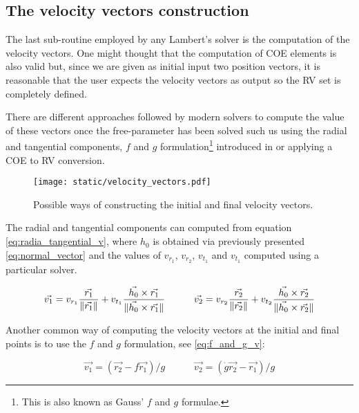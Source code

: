 \subsection{The velocity vectors construction}

The last sub-routine employed by any Lambert's solver is the computation of the
velocity vectors. One might thought that the computation of COE elements is also
valid but, since we are given as initial input two position vectors, it is
reasonable that the user expects the velocity vectors as output so the RV set is
completely defined.

There are different approaches followed by modern solvers to compute the value
of these vectors once the free-parameter has been solved such us using the
radial and tangential components, $f$ and $g$ formulation\footnote{This is also
known as Gauss' $f$ and $g$ formulae.} introduced in \cite{bate1971} or applying a
COE to RV conversion.

\vspace{0.5cm}
\begin{figure}[h]
  \centering
  \texttt{[image: static/velocity\_vectors.pdf]}
  \caption{Possible ways of constructing the initial and final velocity vectors.}
  \label{fig:velocity_vectors}
\end{figure}

The radial and tangential components can computed from equation
\ref{eq:radia_tangential_v}, where $h_0$ is obtained via previously presented
\ref{eq:normal_vector} and the values of $v_{r_1}$, $v_{r_2}$, $v_{t_1}$ and
$v_{t_1}$ computed using a particular solver.

\begin{equation}
	\vec{v_{1}} = v_{r_1} \frac{\vec{r_1}}{\lVert\vec{r_1}\rVert} + v_{t_1} \frac{\vec{h_0} \times \vec{r_1}}{\lVert\vec{h_0} \times \vec{r_1}\rVert}\quad\quad\quad
	\vec{v_{2}} = v_{r_2} \frac{\vec{r_2}}{\lVert\vec{r_2}\rVert} + v_{t_2} \frac{\vec{h_0} \times \vec{r_2}}{\lVert\vec{h_0} \times \vec{r_2}\rVert}
\label{eq:radia_tangential_v}
\end{equation}

Another common way of computing the velocity vectors at the initial and final
points is to use the $f$ and $g$ formulation, see \ref{eq:f_and_g_v}:

\begin{equation}
	\vec{v_1} = (\vec{r_2} - f \vec{r_1}) / g \quad\quad\quad
	\vec{v_2} = (\dot{g} \vec{r_2} - \vec{r_1}) / g
	\label{eq:f_and_g_v}
\end{equation}

